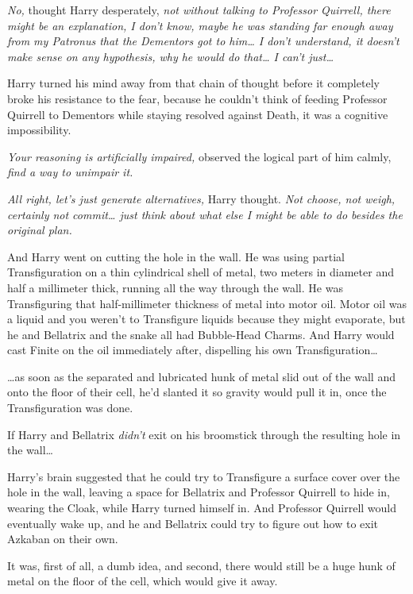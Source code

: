 \emph{No,} thought Harry desperately, \emph{not without talking to
Professor Quirrell, there might be an explanation, I don't know, maybe
he was standing far enough away from my Patronus that the Dementors got
to him\ldots{} I don't understand, it doesn't make sense on any
hypothesis, why he would do that\ldots{} I can't just\ldots{}}

Harry turned his mind away from that chain of thought before it
completely broke his resistance to the fear, because he couldn't think
of feeding Professor Quirrell to Dementors while staying resolved
against Death, it was a cognitive impossibility.

\emph{Your reasoning is artificially impaired,} observed the logical
part of him calmly, \emph{find a way to unimpair it.}

\emph{All right, let's just generate alternatives,} Harry thought.
\emph{Not choose, not weigh, certainly not commit\ldots{} just think
about what else I might be able to do besides the original plan.}

And Harry went on cutting the hole in the wall. He was using partial
Transfiguration on a thin cylindrical shell of metal, two meters in
diameter and half a millimeter thick, running all the way through the
wall. He was Transfiguring that half-millimeter thickness of metal into
motor oil. Motor oil was a liquid and you weren't to Transfigure liquids
because they might evaporate, but he and Bellatrix and the snake all had
Bubble-Head Charms. And Harry would cast Finite on the oil immediately
after, dispelling his own Transfiguration\ldots{}

\ldots{}as soon as the separated and lubricated hunk of metal slid out
of the wall and onto the floor of their cell, he'd slanted it so gravity
would pull it in, once the Transfiguration was done.

If Harry and Bellatrix \emph{didn't} exit on his broomstick through the
resulting hole in the wall\ldots{}

Harry's brain suggested that he could try to Transfigure a surface cover
over the hole in the wall, leaving a space for Bellatrix and Professor
Quirrell to hide in, wearing the Cloak, while Harry turned himself in.
And Professor Quirrell would eventually wake up, and he and Bellatrix
could try to figure out how to exit Azkaban on their own.

It was, first of all, a dumb idea, and second, there would still be a
huge hunk of metal on the floor of the cell, which would give it away.


